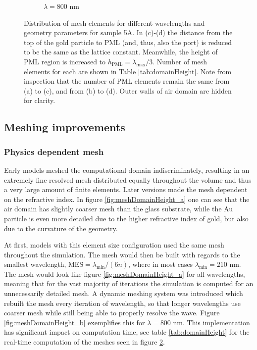 \begin{figure}[htb]
\begin{subfigure}{.2\textwidth}
        \caption{$\lambda=800$ nm}
        \label{fig:meshDomainHeight_d}
    \end{subfigure}
    \caption{Distribution of mesh elements for different wavelengths and geometry parameters for sample 5A. In (c)-(d) the distance from the top of the gold particle to PML (and, thus, also the port) is reduced to be the same as the lattice constant. Meanwhile, the height of PML region is increased to $h_{\text{PML}}=\lambda_{\text{max}}/3$. Number of mesh elements for each are shown in Table \ref{tab:domainHeight}. Note from inspection that the number of PML elements remain the same from (a) to (c), and from (b) to (d). Outer walls of air domain are hidden for clarity.}
    \label{fig:meshDomainHeight}
\end{figure}

\subsection{Meshing improvements}
\label{sec:optimization_mesh}
\subsubsection{Physics dependent mesh}
Early models meshed the computational domain indiscriminately, resulting in an extremely fine resolved mesh distributed equally throughout the volume and thus a very large amount of finite elements. Later versions made the mesh dependent on the refractive index. In figure \ref{fig:meshDomainHeight_a} one can see that the air domain has slightly coarser mesh than the glass substrate, while the Au particle is even more detailed due to the higher refractive index of gold, but also due to the curvature of the geometry. 

At first, models with this element size configuration used the same mesh throughout the simulation. The mesh would then be built with regards to the smallest wavelength, $\text{MES}=\lambda_{\text{min}}/(6n)$, where in most cases $\lambda_{\text{min}}=210$ nm. The mesh would look like figure \ref{fig:meshDomainHeight_a} for all wavelengths, meaning that for the vast majority of iterations the simulation is computed for an unnecessarily detailed mesh. A dynamic meshing system was introduced which rebuilt the mesh every iteration of wavelength, so that longer wavelengths use coarser mesh while still being able to properly resolve the wave. Figure \ref{fig:meshDomainHeight_b} exemplifies this for $\lambda=800$ nm. This implementation has significant impact on computation time, see table \ref{tab:domainHeight} for the real-time computation of the meshes seen in figure \ref{fig:meshDomainHeight}. 

